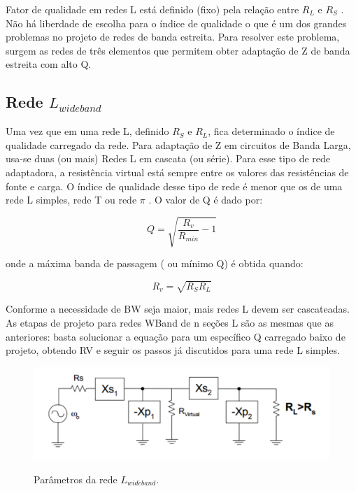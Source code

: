 Fator de qualidade em redes L está definido (fixo) pela relação entre $R_L$ e $R_S$ . Não há liberdade de escolha para o índice de qualidade o que é um dos grandes problemas no projeto de redes de banda estreita. Para resolver este problema, surgem as redes de três elementos que permitem obter adaptação de Z de banda estreita com alto Q.

\subsection{Rede $L_{wideband}$}

Uma vez que em uma rede L, definido $R_S$ e $R_L$, fica determinado o índice de qualidade
carregado da rede. Para adaptação de Z em circuitos de Banda Larga, usa-se duas (ou mais)
Redes L em cascata (ou série). Para esse tipo de rede adaptadora, a resistência virtual está
sempre entre os valores das resistências de fonte e carga. O índice de qualidade desse tipo de
rede é menor que os de uma rede L simples, rede T ou rede $\pi$ . O valor de Q é dado por:

\begin{equation}
Q = \sqrt{\frac{R_v}{R_{min}} -1 }
\end{equation}

onde a máxima banda de passagem ( ou mínimo Q) é obtida quando:

\begin{equation}
R_v = \sqrt{R_SR_L}
\end{equation}

Conforme a necessidade de BW seja maior, mais redes L devem ser cascateadas.
As etapas de projeto para redes WBand de n seções L são as mesmas que as anteriores:
basta solucionar a equação para um específico Q carregado baixo de projeto, obtendo RV e
seguir os passos já discutidos para uma rede L simples.


\begin{figure}[H]
    \centering
    \caption{Parâmetros da rede $L_{wideband}$.}
    \includegraphics[scale=0.3]{Imagens/fig3.png}
    \label{f_fig3}
\end{figure}

